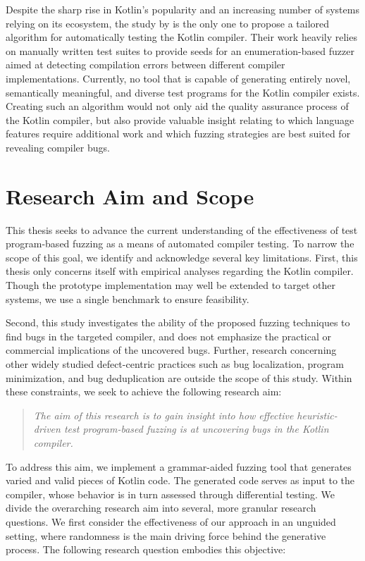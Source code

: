 Despite the sharp rise in Kotlin's popularity and an increasing
number of systems relying on its ecosystem, the study by \citet{stepanov2021type}
is the only one to propose a tailored algorithm for automatically 
testing the Kotlin compiler.
Their work heavily relies on manually written test suites to 
provide seeds for an enumeration-based fuzzer aimed at detecting compilation
errors between different compiler implementations. 
Currently, no tool that is capable of generating entirely novel, semantically 
meaningful, and diverse test programs for the Kotlin compiler exists.
Creating such an algorithm would not only aid the quality assurance process
of the Kotlin compiler, but also provide valuable insight relating to
which language features require additional work and which
fuzzing strategies are best suited for revealing compiler bugs.

\section{\label{sec:aim}Research Aim and Scope}

This thesis seeks to advance the current understanding of the
effectiveness of test program-based fuzzing as a means of automated compiler testing.
To narrow the scope of this goal, we identify and acknowledge several
key limitations.
First, this thesis only concerns itself with empirical analyses regarding
the Kotlin compiler. 
Though the prototype implementation may well be 
extended to target other systems, we use a single benchmark to ensure feasibility.

Second, this study investigates the ability of the proposed fuzzing
techniques to find bugs in the targeted compiler, and does not emphasize
the practical or commercial implications of the uncovered bugs.
Further, research concerning other widely studied defect-centric 
practices such as bug localization, program minimization, and bug deduplication
are outside the scope of this study.
Within these constraints, we seek to achieve the following research aim:

\begin{quote}
\centering 
\emph{The aim of this research is to gain insight into how 
effective heuristic-driven 
test program-based fuzzing is at uncovering bugs in the
Kotlin compiler.}
\end{quote}

To address this aim, we implement a grammar-aided fuzzing tool
that generates varied and valid pieces of Kotlin code. 
The generated code serves as input to the compiler,
whose behavior is in turn assessed through differential testing.
We divide the overarching research aim into several, more granular
research questions.
We first consider the effectiveness of our approach in an unguided
setting, where randomness is the main driving force behind the generative
process.
The following research question embodies this objective:

